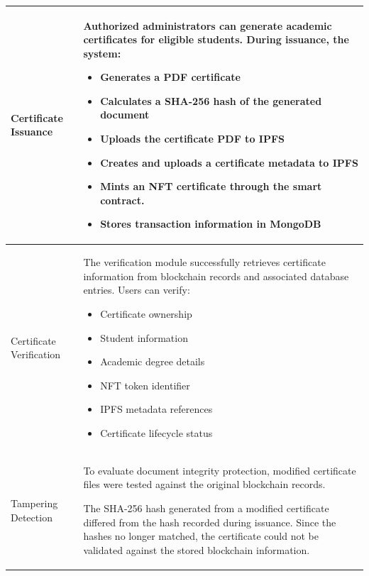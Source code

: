 \begin{longtable}{|m{3.5cm}|m{10.5cm}|}
    \hline
    
    Certificate Issuance 
    & Authorized administrators can generate academic certificates for eligible students. During issuance, the system:
        \begin{itemize}
            \item Generates a PDF certificate

            \item Calculates a SHA-256 hash of the generated document

            \item Uploads the certificate PDF to IPFS

            \item Creates and uploads a certificate metadata to IPFS

            \item Mints an NFT certificate through the smart contract.

            \item Stores transaction information in MongoDB
        \end{itemize}\\
    \hline

    Certificate Verification 
    & The verification module successfully retrieves certificate information from blockchain records and associated database entries. Users can verify:
        \begin{itemize}
            \item Certificate ownership
            \item Student information
            \item Academic degree details
            \item NFT token identifier
            \item IPFS metadata references
            \item Certificate lifecycle status
        \end{itemize}\\
    \hline

    Tampering Detection
    & To evaluate document integrity protection, modified certificate files were tested against the original blockchain records.

    The SHA-256 hash generated from a modified certificate differed from the hash recorded during issuance. Since the hashes no longer matched, the certificate could not be validated against the stored blockchain information.
    

\end{longtable}
